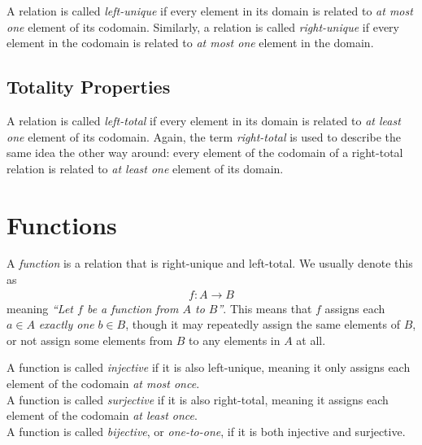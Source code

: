 A relation is called \emph{left-unique} if every element in its domain
is related to \emph{at most one} element of its codomain.
Similarly, a relation is called \emph{right-unique} if every element in the
codomain is related to \emph{at most one} element in the domain.

\subsection{Totality Properties}

A relation is called \emph{left-total} if every element in its domain
is related to \emph{at least one} element of its codomain.
Again, the term \emph{right-total} is used to describe the same idea
the other way around: every element of the codomain of a right-total relation
is related to \emph{at least one} element of its domain.

\section{Functions}

\begin{definition}
  A \emph{function} is a relation that is right-unique and left-total.
  We usually denote this as
  \begin{align*}
    f \colon A \to B
  \end{align*}
  meaning \emph{``Let \(f\) be a function from \(A\) to \(B\)''}.
  This means that \(f\) assigns each \(a \in A\) \emph{exactly one}
  \(b \in B\), though it may repeatedly assign the same elements of \(B\),
  or not assign some elements from \(B\) to any elements in \(A\) at all.
\end{definition}

\begin{definition}
  A function is called \emph{injective} if it is also left-unique, meaning it
  only assigns each element of the codomain \textit{at most once}.\\
  A function is called \emph{surjective} if it is also right-total, meaning it
  assigns each element of the codomain \textit{at least once}.\\
  A function is called \emph{bijective}, or \textit{one-to-one},
  if it is both injective and surjective.
\end{definition}


